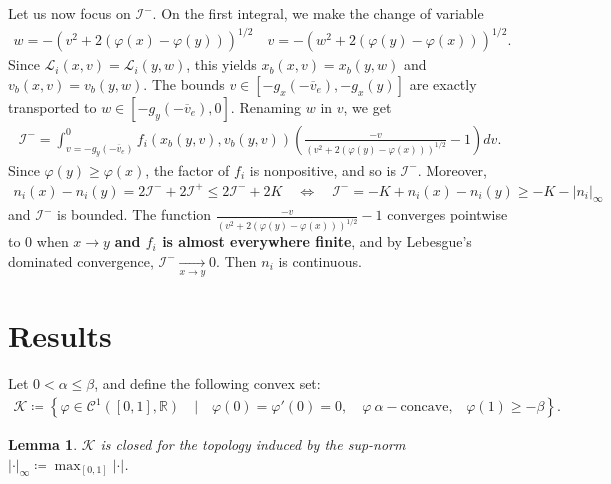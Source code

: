 \documentclass{article}
\newtheorem{lem}{Lemma}[section]
\numberwithin{equation}{section}
\newcommand{\todo}[1]{{\color{red}\textbf{#1}}}
\newcommand{\ve}{{\overline{v}_e}} %
\newcommand{\K}{{\mathcal{K}}} %
\begin{document}
{	Let us now focus on $\mathcal{I}^-$. On the first integral, we make the change of variable
	\begin{align*}
		w = -\left(v^2 + 2 \left(\varphi(x) - \varphi(y)\right)\right)^{1/2} \quad v = -\left(w^2 + 2 \left(\varphi(y) - \varphi(x)\right)\right)^{1/2}.
	\end{align*}
	Since $\mathcal{L}_i(x,v) = \mathcal{L}_i(y,w)$, this yields $x_b(x,v) = x_b(y,w)$ and $v_b(x,v) = v_b(y,w)$. The bounds $v\in[-g_x(-\ve),-g_x(y)]$ are exactly transported to $w\in[-g_y(-\ve),0]$. Renaming $w$ in $v$, we get
	\begin{align*}
		\mathcal{I}^- = \int_{v=-g_y(-\ve)}^{0} f_i(x_b(y,v),v_b(y,v)) \left(\frac{-v}{\left(v^2 + 2 \left(\varphi(y) - \varphi(x)\right)\right)^{1/2}} - 1\right) dv.
	\end{align*}
	Since $\varphi(y) \geqslant \varphi(x)$, the factor of $f_i$ is nonpositive, and so is $\mathcal{I}^-$. Moreover, 
	\begin{align*}
		n_i(x) - n_i(y) = 2 \mathcal{I}^- + 2\mathcal{I}^+ \leqslant 2 \mathcal{I}^{-} + 2 K \quad\iff\quad \mathcal{I}^- = - K + n_i(x) - n_i(y) \geqslant - K - |n_i|_{\infty}
	\end{align*}
	and $\mathcal{I}^-$ is bounded. The function $\frac{-v}{\left(v^2 + 2 \left(\varphi(y) - \varphi(x)\right)\right)^{1/2}} - 1$ converges pointwise to 0 when $x\to y$ \todo{and $f_i$ is almost everywhere finite}, and by Lebesgue's dominated convergence, $\mathcal{I}^- \underset{x\to y}{\longrightarrow} 0$. Then $n_i$ is continuous.
}

\section{Results}

Let $0 < \alpha \leqslant \beta$, and define the following convex set:
\begin{align*}
	\K \coloneqq \left\{\varphi\in\mathcal{C}^1([0,1],\mathbb{R}) \quad |\quad \varphi(0)=\varphi'(0)=0, \quad \varphi\ \alpha-\text{concave,}\quad\varphi(1) \geqslant -\beta\right\}.
\end{align*}

\begin{lem}
	$\K$ is closed for the topology induced by the sup-norm $|\cdot|_{\infty} \coloneqq \max_{[0,1]} |\cdot|$.
\end{lem}
\end{document}
